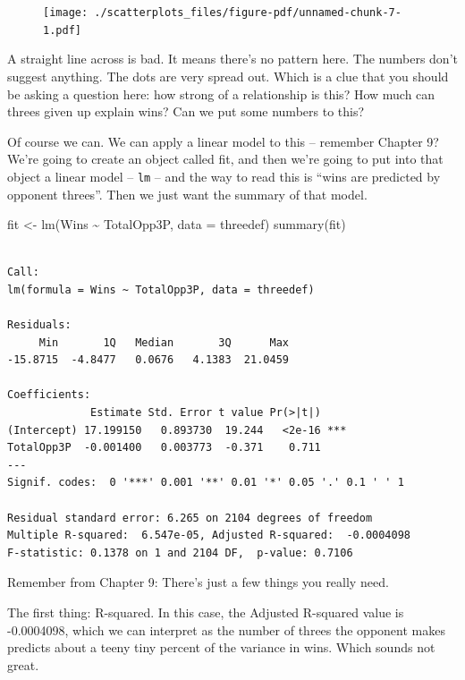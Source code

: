 \documentclass[
  letterpaper,
  DIV=11,
  numbers=noendperiod]{scrreprt}
\newenvironment{Shaded}{\begin{snugshade}}{\end{snugshade}}
\newcommand{\AttributeTok}[1]{\textcolor[rgb]{0.40,0.45,0.13}{#1}}
\newcommand{\FunctionTok}[1]{\textcolor[rgb]{0.28,0.35,0.67}{#1}}
\newcommand{\NormalTok}[1]{\textcolor[rgb]{0.00,0.23,0.31}{#1}}
\newcommand{\OtherTok}[1]{\textcolor[rgb]{0.00,0.23,0.31}{#1}}
\newcommand{\SpecialCharTok}[1]{\textcolor[rgb]{0.37,0.37,0.37}{#1}}
\begin{document}
\begin{figure}[H]

{\centering \texttt{[image: ./scatterplots\_files/figure-pdf/unnamed-chunk-7-1.pdf]}

}

\end{figure}

A straight line across is bad. It means there's no pattern here. The
numbers don't suggest anything. The dots are very spread out. Which is a
clue that you should be asking a question here: how strong of a
relationship is this? How much can threes given up explain wins? Can we
put some numbers to this?

Of course we can. We can apply a linear model to this -- remember
Chapter 9? We're going to create an object called fit, and then we're
going to put into that object a linear model -- \texttt{lm} -- and the
way to read this is ``wins are predicted by opponent threes''. Then we
just want the summary of that model.

\begin{Shaded}
\begin{Highlighting}[]
\NormalTok{fit }\OtherTok{\textless{}{-}} \FunctionTok{lm}\NormalTok{(Wins }\SpecialCharTok{\textasciitilde{}}\NormalTok{ TotalOpp3P, }\AttributeTok{data =}\NormalTok{ threedef)}
\FunctionTok{summary}\NormalTok{(fit)}
\end{Highlighting}
\end{Shaded}

\begin{verbatim}

Call:
lm(formula = Wins ~ TotalOpp3P, data = threedef)

Residuals:
     Min       1Q   Median       3Q      Max 
-15.8715  -4.8477   0.0676   4.1383  21.0459 

Coefficients:
             Estimate Std. Error t value Pr(>|t|)    
(Intercept) 17.199150   0.893730  19.244   <2e-16 ***
TotalOpp3P  -0.001400   0.003773  -0.371    0.711    
---
Signif. codes:  0 '***' 0.001 '**' 0.01 '*' 0.05 '.' 0.1 ' ' 1

Residual standard error: 6.265 on 2104 degrees of freedom
Multiple R-squared:  6.547e-05, Adjusted R-squared:  -0.0004098 
F-statistic: 0.1378 on 1 and 2104 DF,  p-value: 0.7106
\end{verbatim}

Remember from Chapter 9: There's just a few things you really need.

The first thing: R-squared. In this case, the Adjusted R-squared value
is -0.0004098, which we can interpret as the number of threes the
opponent makes predicts about a teeny tiny percent of the variance in
wins. Which sounds not great.
\end{document}
